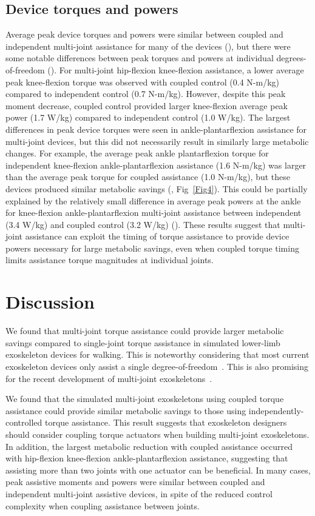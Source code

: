 \documentclass[10pt,letterpaper]{article}
\begin{document}
\subsection*{Device torques and powers}
Average peak device torques and powers were similar between coupled and independent multi-joint assistance for many of the devices (), but there were some notable differences between peak torques and powers at individual degrees-of-freedom (). For multi-joint hip-flexion knee-flexion assistance, a lower average peak knee-flexion torque was observed with coupled control (0.4 N-m/kg) compared to independent control (0.7 N-m/kg). However, despite this peak moment decrease, coupled control provided larger knee-flexion average peak power (1.7 W/kg) compared to independent control (1.0 W/kg). The largest differences in peak device torques were seen in ankle-plantarflexion assistance for multi-joint devices, but this did not necessarily result in similarly large metabolic changes. For example, the average peak ankle plantarflexion torque for independent knee-flexion ankle-plantarflexion assistance (1.6 N-m/kg) was larger than the average peak torque for coupled assistance (1.0 N-m/kg), but these devices produced similar metabolic savings (, Fig~\ref{Fig4}). This could be partially explained by the relatively small difference in average peak powers at the ankle for knee-flexion ankle-plantarflexion multi-joint assistance between independent (3.4 W/kg) and coupled control (3.2 W/kg) (). These results suggest that multi-joint assistance can exploit the timing of torque assistance to provide device powers necessary for large metabolic savings, even when coupled torque timing limits assistance torque magnitudes at individual joints.

\section*{Discussion}
We found that multi-joint torque assistance could provide larger metabolic savings compared to single-joint torque assistance in simulated lower-limb exoskeleton devices for walking. This is noteworthy considering that most current exoskeleton devices only assist a single degree-of-freedom~\cite{Gordon:2007, Mooney:2014, Collins:2015, Zhang:2017, Galle:2017, Kim:2019, Lim:2019}. This is also promising for the recent development of multi-joint exoskeletons~\cite{Bryan:2020}.
 
We found that the simulated multi-joint exoskeletons using coupled torque assistance could provide similar metabolic savings to those using independently-controlled torque assistance. This result suggests that exoskeleton designers should consider coupling torque actuators when building multi-joint exoskeletons. In addition, the largest metabolic reduction with coupled assistance occurred with hip-flexion knee-flexion ankle-plantarflexion assistance, suggesting that assisting more than two joints with one actuator can be beneficial. In many cases, peak assistive moments and powers were similar between coupled and independent multi-joint assistive devices, in spite of the reduced control complexity when coupling assistance between joints.
 
\end{document}
